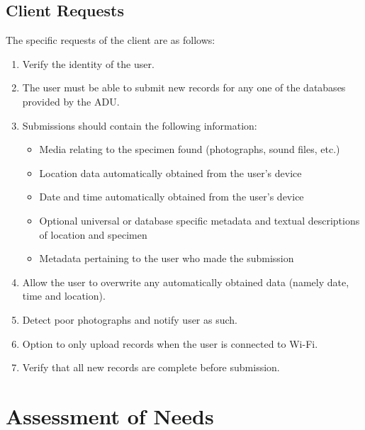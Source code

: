 \documentclass[
10pt, %
a4paper, %
oneside, %
headinclude,footinclude, %
BCOR5mm, %
]{scrartcl}
\begin{document}
\subsection{Client Requests} %
\label{sub:client_requests}

The specific requests of the client are as follows:
\begin{enumerate}
\item Verify the identity of the user.
\item The user must be able to submit new records for any one of the databases provided by the ADU.
\item Submissions should contain the following information:
\begin{itemize}
  \item Media relating to the specimen found (photographs, sound files, etc.)
  \item Location data automatically obtained from the user's device
  \item Date and time automatically obtained from the user's device
  \item Optional universal or database specific metadata and textual descriptions of location and specimen
  \item Metadata pertaining to the user who made the submission
\end{itemize}
\item Allow the user to overwrite any automatically obtained data (namely date, time and location).
\item Detect poor photographs and notify user as such.
\item Option to only upload records when the user is connected to Wi-Fi.
\item Verify that all new records are complete before submission.
\end{enumerate}



\section{Assessment of Needs} %
\label{sec:assessment_of_needs}
\end{document}
